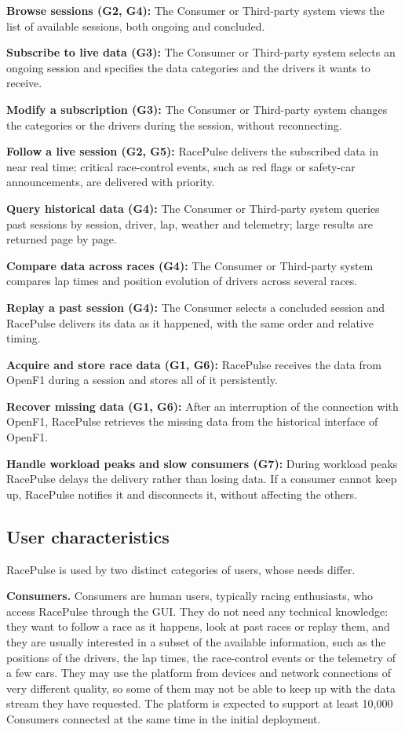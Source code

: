 \documentclass[11pt,a4paper]{article}
\newcommand{\RP}{RacePulse}
\begin{document}
\textbf{Browse sessions (G2, G4):} The Consumer or Third-party system views the list of available sessions, both
ongoing and concluded.

\textbf{Subscribe to live data (G3):} The Consumer or Third-party system selects an ongoing session and specifies
the data categories and the drivers it wants to receive.

\textbf{Modify a subscription (G3):} The Consumer or Third-party system changes the categories or the drivers
during the session, without reconnecting.

\textbf{Follow a live session (G2, G5):} \RP{} delivers the subscribed data in near real time; critical
race-control events, such as red flags or safety-car announcements, are delivered with priority.

\textbf{Query historical data (G4):} The Consumer or Third-party system queries past sessions by session, driver,
lap, weather and telemetry; large results are returned page by page.

\textbf{Compare data across races (G4):} The Consumer or Third-party system compares lap times and position
evolution of drivers across several races.

\textbf{Replay a past session (G4):} The Consumer selects a concluded session and \RP{} delivers its data as it
happened, with the same order and relative timing.

\textbf{Acquire and store race data (G1, G6):} \RP{} receives the data from OpenF1 during a session and stores all
of it persistently.

\textbf{Recover missing data (G1, G6):} After an interruption of the connection with OpenF1, \RP{} retrieves the
missing data from the historical interface of OpenF1.

\textbf{Handle workload peaks and slow consumers (G7):} During workload peaks \RP{} delays the delivery rather
than losing data. If a consumer cannot keep up, \RP{} notifies it and disconnects it, without affecting the others.

\subsection{User characteristics}
\RP{} is used by two distinct categories of users, whose needs differ.

\textbf{Consumers.} Consumers are human users, typically racing enthusiasts, who access \RP{} through the GUI. They
do not need any technical knowledge: they want to follow a race as it happens, look at past races or replay them,
and they are usually interested in a subset of the available information, such as the positions of the drivers,
the lap times, the race-control events or the telemetry of a few cars. They may use the platform from devices and
network connections of very different quality, so some of them may not be able to keep up with the data stream they
have requested. The platform is expected to support at least 10{,}000 Consumers connected at the same time in the
initial deployment.
\end{document}
